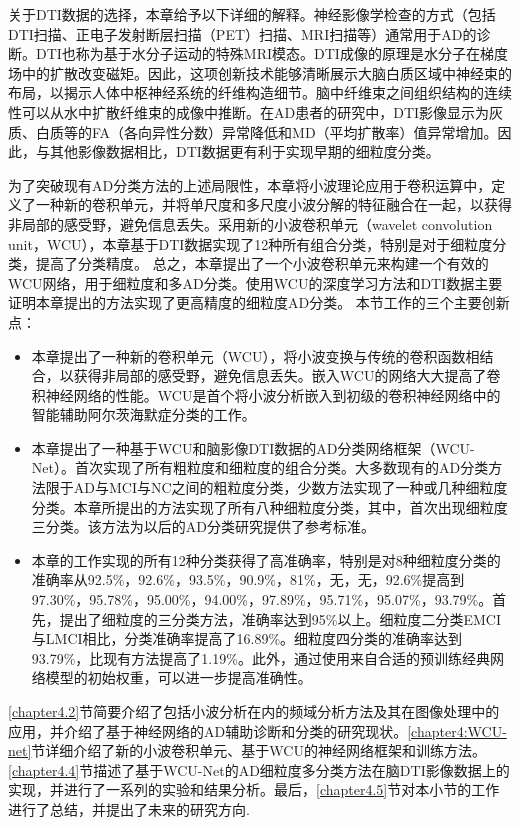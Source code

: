 关于DTI数据的选择，本章给予以下详细的解释。神经影像学检查的方式（包括DTI扫描、正电子发射断层扫描（PET）扫描、MRI扫描等）通常用于AD的诊断。DTI\cite{huynh2019multi}也称为基于水分子运动的特殊MRI模态。DTI成像的原理是水分子在梯度场中的扩散改变磁矩。因此，这项创新技术能够清晰展示大脑白质区域中神经束的布局，以揭示人体中枢神经系统的纤维构造细节。脑中纤维束之间组织结构的连续性可以从水中扩散纤维束的成像中推断\cite{frisoni2010clinical}。在AD患者的研究中，DTI影像显示为灰质、白质等的FA（各向异性分数）异常降低和MD（平均扩散率）值异常增加。因此，与其他影像数据相比，DTI数据更有利于实现早期的细粒度分类。

为了突破现有AD分类方法的上述局限性，本章将小波理论应用于卷积运算中，定义了一种新的卷积单元，并将单尺度和多尺度小波分解的特征融合在一起，以获得非局部的感受野，避免信息丢失。采用新的小波卷积单元（wavelet convolution unit，WCU），本章基于DTI数据实现了12种所有组合分类，特别是对于细粒度分类，提高了分类精度。
总之，本章提出了一个小波卷积单元来构建一个有效的WCU网络，用于细粒度和多AD分类。使用WCU的深度学习方法和DTI数据主要证明本章提出的方法实现了更高精度的细粒度AD分类。
本节工作的三个主要创新点：
\begin{itemize}
    \item 本章提出了一种新的卷积单元（WCU），将小波变换与传统的卷积函数相结合，以获得非局部的感受野，避免信息丢失。嵌入WCU的网络大大提高了卷积神经网络的性能。WCU是首个将小波分析嵌入到初级的卷积神经网络中的智能辅助阿尔茨海默症分类的工作。
    \item 本章提出了一种基于WCU和脑影像DTI数据的AD分类网络框架（WCU-Net）。首次实现了所有粗粒度和细粒度的组合分类。大多数现有的AD分类方法限于AD与MCI与NC之间的粗粒度分类，少数方法实现了一种或几种细粒度分类。本章所提出的方法实现了所有八种细粒度分类，其中，首次出现细粒度三分类。该方法为以后的AD分类研究提供了参考标准。
    \item 本章的工作实现的所有12种分类获得了高准确率，特别是对8种细粒度分类的准确率从92.5\%，92.6\%，93.5\%，90.9\%，81\%，无，无，92.6\%提高到97.30\%，95.78\%，95.00\%，94.00\%，97.89\%，95.71\%，95.07\%，93.79\%。首先，提出了细粒度的三分类方法，准确率达到95\%以上。细粒度二分类EMCI与LMCI相比，分类准确率提高了16.89\%。细粒度四分类的准确率达到93.79\%，比现有方法提高了1.19\%。此外，通过使用来自合适的预训练经典网络模型的初始权重，可以进一步提高准确性。
\end{itemize}


\ref{chapter4.2}节简要介绍了包括小波分析在内的频域分析方法及其在图像处理中的应用，并介绍了基于神经网络的AD辅助诊断和分类的研究现状。\ref{chapter4:WCU-net}节详细介绍了新的小波卷积单元、基于WCU的神经网络框架和训练方法。\ref{chapter4.4}节描述了基于WCU-Net的AD细粒度多分类方法在脑DTI影像数据上的实现，并进行了一系列的实验和结果分析。最后，\ref{chapter4.5}节对本小节的工作进行了总结，并提出了未来的研究方向.


